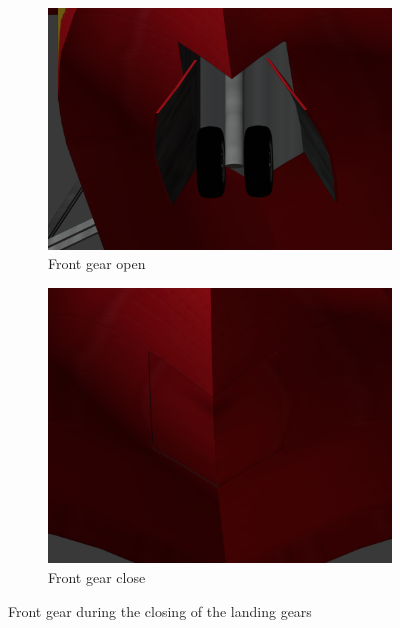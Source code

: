 \documentclass{article}
\begin{document}
\begin{figure}[h!]
  \centering
  \begin{subfigure}[h!]{0.4\linewidth}
    \includegraphics[width=\linewidth]{antopen.png}
    \caption{Front gear open}
  \end{subfigure}
  \begin{subfigure}[h!]{0.4\linewidth}
    \includegraphics[width=\linewidth]{antclose.png}
    \caption{Front gear close}
  \end{subfigure}
  \caption{Front gear during the closing of the landing gears}
\end{figure}
\end{document}
